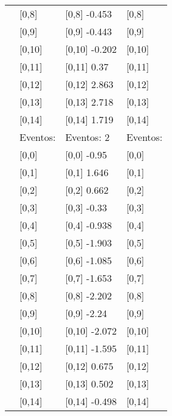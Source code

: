 \begin{table}
\begin{tabular}[t]{llll}
\addlinespace
 & {}[0,8] & {}[0,8] -0.453 & {}[0,8]\\
 & {}[0,9] & {}[0,9] -0.443 & {}[0,9]\\
 & {}[0,10] & {}[0,10] -0.202 & {}[0,10]\\
 & {}[0,11] & {}[0,11] 0.37 & {}[0,11]\\
 & {}[0,12] & {}[0,12] 2.863 & {}[0,12]\\
\addlinespace
 & {}[0,13] & {}[0,13] 2.718 & {}[0,13]\\
 & {}[0,14] & {}[0,14] 1.719 & {}[0,14]\\
 & Eventos: & Eventos:  2 & Eventos:\\
 & {}[0,0] & {}[0,0] -0.95 & {}[0,0]\\
 & {}[0,1] & {}[0,1] 1.646 & {}[0,1]\\
\addlinespace
 & {}[0,2] & {}[0,2] 0.662 & {}[0,2]\\
 & {}[0,3] & {}[0,3] -0.33 & {}[0,3]\\
 & {}[0,4] & {}[0,4] -0.938 & {}[0,4]\\
 & {}[0,5] & {}[0,5] -1.903 & {}[0,5]\\
 & {}[0,6] & {}[0,6] -1.085 & {}[0,6]\\
\addlinespace
1000 & {}[0,7] & {}[0,7] -1.653 & {}[0,7]\\
 & {}[0,8] & {}[0,8] -2.202 & {}[0,8]\\
 & {}[0,9] & {}[0,9] -2.24 & {}[0,9]\\
 & {}[0,10] & {}[0,10] -2.072 & {}[0,10]\\
 & {}[0,11] & {}[0,11] -1.595 & {}[0,11]\\
\addlinespace
 & {}[0,12] & {}[0,12] 0.675 & {}[0,12]\\
 & {}[0,13] & {}[0,13] 0.502 & {}[0,13]\\
 & {}[0,14] & {}[0,14] -0.498 & {}[0,14]\\
\bottomrule
\end{tabular}
\end{table}
